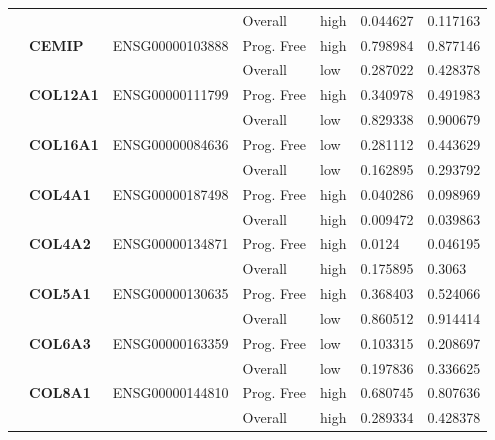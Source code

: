 \begin{spacing}{1}
{\begin{longtable}{%
            |>{\bfseries}p{2cm}|
            >{\bfseries}p{1.9cm}|
            >{\tiny}p{1.9cm}|
            p{2cm}|
            p{2cm}|
            p{1.5cm}|
            p{1.5cm}|
            }
            \hhline{~~~----}
             &          &                 & Overall    & high & 0.044627 & 0.117163 \\
            \hhline{~======}
             & CEMIP    & ENSG00000103888 & Prog. Free & high & 0.798984 & 0.877146 \\
            \hhline{~~~----}
             &          &                 & Overall    & low  & 0.287022 & 0.428378 \\
            \hhline{~======}
             & COL12A1  & ENSG00000111799 & Prog. Free & high & 0.340978 & 0.491983 \\
            \hhline{~~~----}
             &          &                 & Overall    & low  & 0.829338 & 0.900679 \\
            \hhline{~======}
             & COL16A1  & ENSG00000084636 & Prog. Free & low  & 0.281112 & 0.443629 \\
            \hhline{~~~----}
             &          &                 & Overall    & low  & 0.162895 & 0.293792 \\
            \hhline{~======}
             & COL4A1   & ENSG00000187498 & Prog. Free & high & 0.040286 & 0.098969 \\
            \hhline{~~~----}
             &          &                 & Overall    & high & 0.009472 & 0.039863 \\
            \hhline{~======}
             & COL4A2   & ENSG00000134871 & Prog. Free & high & 0.0124   & 0.046195 \\
            \hhline{~~~----}
             &          &                 & Overall    & high & 0.175895 & 0.3063   \\
            \hhline{~======}
             & COL5A1   & ENSG00000130635 & Prog. Free & high & 0.368403 & 0.524066 \\
            \hhline{~~~----}
             &          &                 & Overall    & low  & 0.860512 & 0.914414 \\
            \hhline{~======}
             & COL6A3   & ENSG00000163359 & Prog. Free & low  & 0.103315 & 0.208697 \\
            \hhline{~~~----}
             &          &                 & Overall    & low  & 0.197836 & 0.336625 \\
            \hhline{~======}
             & COL8A1   & ENSG00000144810 & Prog. Free & high & 0.680745 & 0.807636 \\
            \hhline{~~~----}
             &          &                 & Overall    & high & 0.289334 & 0.428378 \\

\end{longtable}}
\end{spacing}
